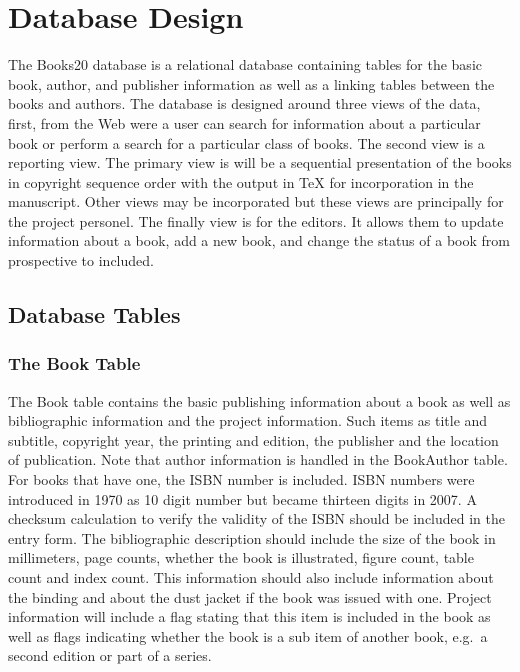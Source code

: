 \documentclass{article}
\begin{document}
%
%
\section{Database Design}

The Books20 database is a relational database containing tables for
the basic book, author, and publisher information as well as a linking
tables between the books and authors.  The database is designed around
three views of the data, first, from the Web were a user can search
for information about a particular book or perform a search for a
particular class of books.  The second view is a reporting view. The
primary view is will be a sequential presentation of the books in
copyright sequence order with the output in TeX for incorporation in
the manuscript. Other views may be incorporated but these views are
principally for the project personel. The finally view is for the
editors.  It allows them to update information about a book, add a new
book, and change the status of a book from prospective to included.

\subsection{Database Tables}
\subsubsection{The Book Table}

The Book table contains the basic publishing information about a book
as well as bibliographic information and the project information. Such
items as title and subtitle, copyright year, the printing and edition,
the publisher and the location of publication. Note that author
information is handled in the BookAuthor table. For books that have
one, the ISBN number is included.  ISBN numbers were introduced in
1970 as 10 digit number but became thirteen digits in 2007.  A
checksum calculation to verify the validity of the ISBN should be
included in the entry form. The bibliographic description should
include the size of the book in millimeters, page counts, whether the
book is illustrated, figure count, table count and index count.  This
information should also include information about the binding and
about the dust jacket if the book was issued with one. Project
information will include a flag stating that this item is included in
the book as well as flags indicating whether the book is a sub item of
another book, e.g.\ a second edition or part of a series.
\end{document}
